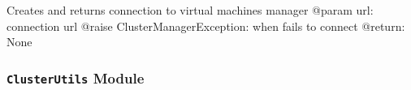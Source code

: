 \documentclass[a4paper,11pt,openany]{sphinxmanual}
\begin{document}
\begin{fulllineitems}
\begin{fulllineitems}
\end{fulllineitems}


\begin{fulllineitems}
\label{ref-manual/XrdTest:XrdTest.ClusterManager.ClusterManager.virtconnect}
Creates and returns connection to virtual machines manager
@param url: connection url
@raise ClusterManagerException: when fails to connect
@return: None

\end{fulllineitems}


\end{fulllineitems}



\subsubsection{\texttt{ClusterUtils} Module}
\label{ref-manual/XrdTest:clusterutils-module}\label{ref-manual/XrdTest:module-XrdTest.ClusterUtils}
\end{document}
